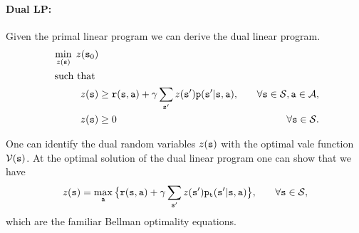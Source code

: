 \paragraph{Dual LP:}
Given the primal linear program we can derive the dual linear
program.
\begin{align*}
\min_{z(\state)}  \;z(\state_0)&\\
\mbox{ such that }\\
%
 z(\state) &\geq
\reward(\state,\action) + \discount
\sum_{\state'}z(\state')\transitionprob(\state'|\state,\action) , &\quad\forall
\state \in {\States},\action\in\Actions, \\ 
 z(\state) &\geq 0  &\quad\forall \state \in {\States}.
\end{align*}

One can identify the dual random variables $z({\tt s})$ with the
optimal vale function $\mathcal{V}({\tt s})$. At the optimal solution of
the dual linear program one can show that we have
\begin{align*}
 z({\tt s}) &= \max_{\tt a} \big\{
{\tt r}({\tt s},{\tt a}) + \gamma
\sum_{{\tt s}'}z({\tt s}'){\tt p}_{{\tt t}}({\tt s}'|{\tt s},{\tt a}) \big\} ,
&\quad\forall {\tt s} \in {\mathcal{S}},
\end{align*}
which are the familiar Bellman optimality equations.

%
%
%
%


% 
% 
% 